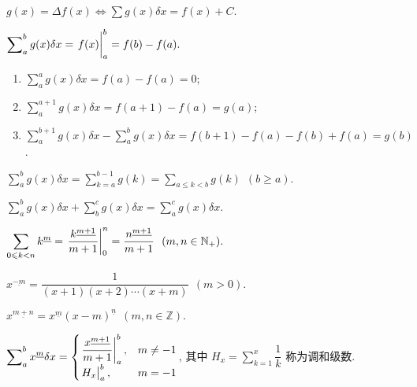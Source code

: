 \begin{definition}[不定和]
    $\displaystyle g(x)=\varDelta f(x)\iff \sum g(x)\delta x=f(x)+C.$
\end{definition}

\begin{definition}[定和]
    $\displaystyle \sum\nolimits_{a}^{b} g(x)\delta x=\eval{f(x)}_{a}^{b}=f(b)-f(a).$
\end{definition}

\begin{enumerate}[label=(\arabic{*})]
    \item $\displaystyle \sum\nolimits_a^a g(x)\delta x=f(a)-f(a)=0$;
    \item $\displaystyle \sum\nolimits_a^{a+1} g(x)\delta x=f(a+1)-f(a)=g(a)$;
    \item $\displaystyle \sum\nolimits_{a}^{b+1}g(x)\delta x-\sum\nolimits_{a}^{b}g(x)\delta x=f(b+1)-f(a)-f(b)+f(a)=g(b)$.
\end{enumerate}

\begin{theorem}
    $\displaystyle \sum\nolimits_{a}^{b}g(x)\delta x=\sum_{k=a}^{b-1}g(k)=\sum_{a\leqslant k<b}g(k)~~(b\geqslant a).$
\end{theorem}

\begin{theorem}
    $\displaystyle \sum\nolimits_{a}^{b}g(x)\delta x+\sum\nolimits_b^c g(x)\delta x=\sum\nolimits_a^cg(x)\delta x.$
\end{theorem}

\begin{theorem}
    $\displaystyle \sum_{0\leqslant k<n}k^{\underline{m}}=\eval{\dfrac{k^{\underline{m+1}}}{m+1}}_{0}^{n}=\dfrac{n^{\underline{m+1}}}{m+1}~~(m,n\in\mathbb{N}_+).$
\end{theorem}

\begin{definition}
    $x^{\underline{-m}}=\dfrac{1}{(x+1)(x+2)\cdots(x+m)}~~(m>0).$
\end{definition}

\begin{theorem}
    $x^{\underline{m+n}}=x^{\underline{m}}(x-m)^{\underline{n}} ~~(m,n\in\mathbb{Z}).$
\end{theorem}

\begin{theorem}
    $\displaystyle\sum\nolimits_a^b x^{\underline{m}}\delta x=\begin{cases}
            \eval{\dfrac{x^{\underline{m+1}}}{m+1}}_{a}^{b}, & m\neq -1 \\
            \eval{H_x}_{a}^{b},                              & m=-1
        \end{cases}$, 
    其中 $\displaystyle H_x=\sum_{k=1}^{x}\dfrac{1}{k}$ 称为调和级数.
\end{theorem}

